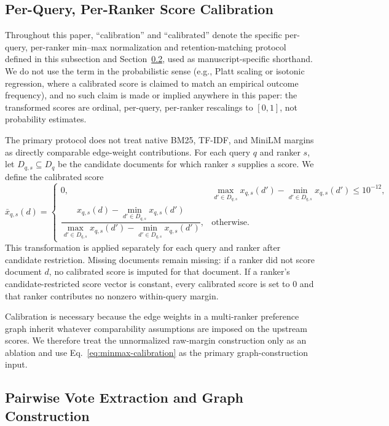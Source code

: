 \documentclass[manuscript,anonymous,review]{acmart}
\begin{document}
\subsection{Per-Query, Per-Ranker Score Calibration}
\label{sec:score-calibration}

Throughout this paper, ``calibration'' and ``calibrated'' denote the specific
per-query, per-ranker min--max normalization and retention-matching protocol
defined in this subsection and Section~\ref{sec:vote-extraction}, used as
manuscript-specific shorthand. We do not use the term in the probabilistic
sense (e.g., Platt scaling or isotonic regression, where a calibrated score is
claimed to match an empirical outcome frequency), and no such claim is made or
implied anywhere in this paper: the transformed scores are ordinal,
per-query, per-ranker rescalings to $[0,1]$, not probability estimates.

The primary protocol does not treat native BM25, TF-IDF, and MiniLM margins as
directly comparable edge-weight contributions. For each query $q$ and ranker
$s$, let $D_{q,s} \subseteq D_q$ be the candidate documents for which ranker
$s$ supplies a score. We define the calibrated score
\begin{equation}
  \bar{x}_{q,s}(d) =
  \begin{cases}
    0, & \max_{d' \in D_{q,s}} x_{q,s}(d') - \min_{d' \in D_{q,s}} x_{q,s}(d') \le 10^{-12}, \\[4pt]
    \dfrac{x_{q,s}(d) - \min_{d' \in D_{q,s}} x_{q,s}(d')}
    {\max_{d' \in D_{q,s}} x_{q,s}(d') - \min_{d' \in D_{q,s}} x_{q,s}(d')},
    & \text{otherwise.}
  \end{cases}
  \label{eq:minmax-calibration}
\end{equation}
This transformation is applied separately for each query and ranker after
candidate restriction. Missing documents remain missing: if a ranker did not
score document $d$, no calibrated score is imputed for that document. If a
ranker's candidate-restricted score vector is constant, every calibrated score
is set to $0$ and that ranker contributes no nonzero within-query margin.

Calibration is necessary because the edge weights in a multi-ranker preference
graph inherit whatever comparability assumptions are imposed on the upstream
scores. We therefore treat the unnormalized raw-margin construction only as an
ablation and use Eq.~\eqref{eq:minmax-calibration} as the primary
graph-construction input.

\subsection{Pairwise Vote Extraction and Graph Construction}
\label{sec:vote-extraction}
\end{document}
